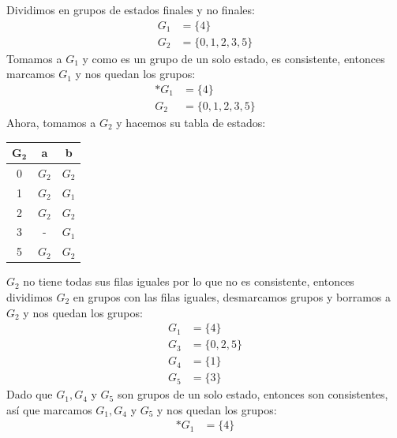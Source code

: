 \documentclass[12pt, letterpaper]{article}
\begin{document}
\begin{enumerate}
\begin{enumerate}

      Dividimos en grupos de estados finales y no finales:
      \begin{align*}
        G_1 &= \{4\} \\
        G_2 &= \{0, 1, 2, 3, 5\}
      \end{align*}
      Tomamos a $G_1$ y como es un grupo de un solo estado, es consistente, entonces marcamos $G_1$ y nos quedan los grupos:
      \begin{align*}
        \ast G_1 &= \{4\} \\
        G_2 &= \{0, 1, 2, 3, 5\}
      \end{align*}
      Ahora, tomamos a $G_2$ y hacemos su tabla de estados:
      \begin{table}[H]
        \centering
        \begin{tabular}{|c|c|c|}
          \hline
          $\bm{G_2}$ & \textbf{a} & \textbf{b} \\ \hline
          0             & $G_2$       & $G_2$       \\ \hline
          1             & $G_2$       & $G_1$       \\ \hline
          2             & $G_2$       & $G_2$       \\ \hline
          3             & -           & $G_1$       \\ \hline
          5             & $G_2$       & $G_2$       \\ \hline
        \end{tabular}
      \end{table}
      $G_2$ no tiene todas sus filas iguales por lo que no es consistente, entonces dividimos $G_2$ en grupos con las filas iguales, desmarcamos grupos y borramos a $G_2$ y nos quedan los grupos:
      \begin{align*}
        G_1 &= \{4\} \\
        G_3 &= \{0, 2, 5\} \\
        G_4 &= \{1\} \\
        G_5 &= \{3\}
      \end{align*}
      Dado que $G_1, G_4$ y $G_5$ son grupos de un solo estado, entonces son consistentes, así que marcamos $G_1, G_4$ y $G_5$ y nos quedan los grupos:
      \begin{align*}
        \ast G_1 &= \{4\} \\

\end{align*}
\end{enumerate}
\end{enumerate}
\end{document}
